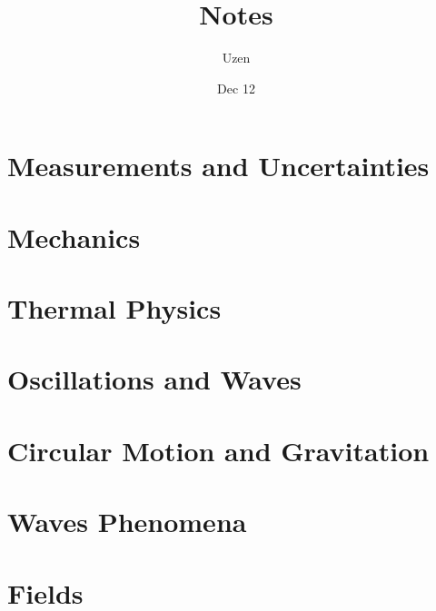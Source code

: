 \documentclass{report}
\title{Notes}
\author{Uzen}
\date{Dec 12}
\begin{document}
\maketitle
\tableofcontents

\chapter{Measurements and Uncertainties}


\chapter{Mechanics}


\chapter{Thermal Physics}


\chapter{Oscillations and Waves}


\chapter{Circular Motion and Gravitation}


\chapter{Waves Phenomena}


\chapter{Fields}

\end{document}
